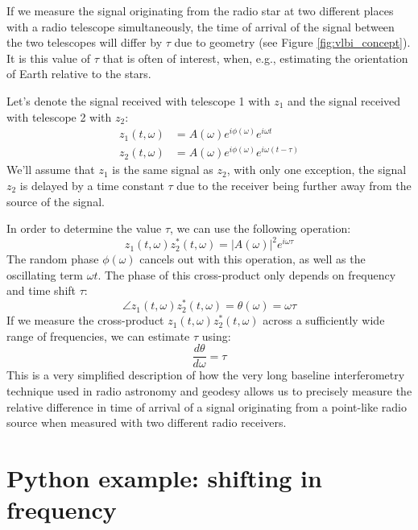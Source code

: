 If we measure the signal originating from the radio star at two different places with a
radio telescope simultaneously, the time of arrival of the signal between the two telescopes
will differ by $\tau$ due to geometry (see Figure \ref{fig:vlbi_concept}).
It is this value of $\tau$ that is often of interest, when, e.g., estimating
the orientation of Earth relative to the stars.

Let's denote the signal received with telescope 1 with $z_1$ and the signal received with telescope 2 with $z_2$:
\begin{align}
  z_1(t,\omega) & = A(\omega) e^{i\phi(\omega)} e^{i\omega t}        \\
  z_2(t,\omega) & = A(\omega) e^{i\phi(\omega)} e^{i\omega (t-\tau)}
\end{align}
We'll assume that $z_1$ is the same signal as $z_2$, with only one exception, the signal $z_2$
is delayed by a time constant $\tau$ due to the receiver being further away
from the source of the signal.

In order to determine the value $\tau$, we can use the following operation:
\begin{equation}
  z_1(t,\omega)z_2^*(t,\omega) = |A(\omega)|^2 e^{i\omega \tau}
\end{equation}
The random phase $\phi(\omega)$ cancels out with this operation, as well as the oscillating
term $\omega t$. The phase of this cross-product only depends on frequency and time shift $\tau$:
\begin{equation}
  \angle z_1(t,\omega)z_2^*(t,\omega) = \theta(\omega)= \omega \tau
\end{equation}
If we measure the cross-product $z_1(t,\omega)z_2^*(t,\omega)$ across a sufficiently
wide range of frequencies, we can estimate $\tau$ using:
\begin{equation}
  \frac{d\theta}{d\omega}= \tau
\end{equation}
This is a very simplified description of how the very long baseline interferometry
technique used in radio astronomy and geodesy allows us to precisely measure the
relative difference in time of arrival of a signal originating from a point-like
radio source when measured with two different radio receivers.


\section{Python example: shifting in frequency}

